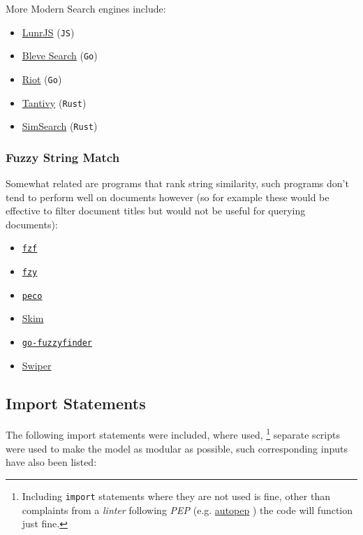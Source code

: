 \documentclass[a4paper,11pt,twoside]{article}
\begin{document}
More Modern Search engines include:

\begin{itemize}
\item \href{https://github.com/olivernn/lunr.js/}{LunrJS}  (\texttt{JS}) \cite{nightingaleOlivernnLunrJs2021}
\item \href{https://github.com/blevesearch/bleve}{Bleve Search} (\texttt{Go}) \cite{martyschochBleveSearchDocumentation}
\item \href{https://github.com/go-ego/riot}{Riot} (\texttt{Go}) \cite{vzGoegoRiot2021}
\item \href{https://github.com/tantivy-search/tantivy}{Tantivy} (\texttt{Rust}) \cite{clementrenaultMeilisearchMeiliSearch2021}
\item \href{https://github.com/andylokandy/simsearch-rs}{SimSearch} (\texttt{Rust}) \cite{lokAndylokandySimsearchrs2021}
\end{itemize}


\subsubsection{Fuzzy String Match}
\label{sec:org65a0cc6}
Somewhat related are programs that rank string similarity, such programs don't tend
to perform well on documents however (so for example these would
be effective to filter document titles but would not be useful for
querying documents):

\begin{itemize}
\item \href{https://github.com/junegunn/fzf}{\texttt{fzf}} \cite{choiJunegunnFzf2021}
\item \href{https://github.com/jhawthorn/fzy}{\texttt{fzy}} \cite{hawthornJhawthornFzy2021}
\item \href{https://github.com/peco/peco}{\texttt{peco}} \cite{lestrratPecoPeco2021}
\item \href{https://github.com/lotabout/skim}{Skim} \cite{zhangLotaboutSkim2021}
\item \href{https://github.com/lotabout/skim}{\texttt{go-fuzzyfinder}} \cite{ktrKtr0731Gofuzzyfinder2021}
\item \href{https://github.com/lotabout/skim}{Swiper} \cite{krehelAboaboSwiper2021}
\end{itemize}

\subsection{Import Statements}
\label{sec:org30e490f}
The following import statements were included, where used, \footnote{Including \texttt{import} statements where they are not used is fine,
other than complaints from a \emph{linter} following \emph{PEP}
\cite{nickcoghlanPEPStyleGuide2001} (e.g. \href{https://pypi.org/project/autopep8/}{autopep}
\cite{hattoriAutopep8ToolThat}) the code will function just fine.}
separate scripts were used to make the model as modular as possible,
such corresponding inputs have also been listed:
\end{document}
